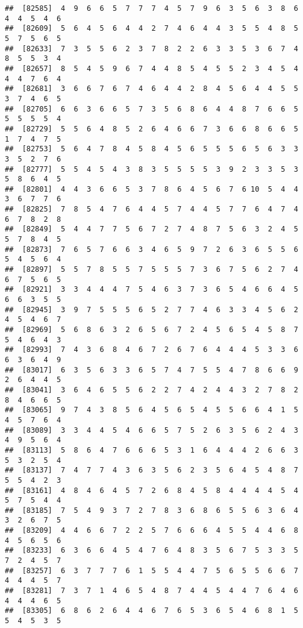 \documentclass[
]{book}
\begin{document}
\begin{verbatim}
##  [82585]  4  9  6  6  5  7  7  7  4  5  7  9  6  3  5  6  3  8  6  4  4  5  4  6
##  [82609]  5  6  4  5  6  4  4  2  7  4  6  4  4  3  5  5  4  8  5  5  7  5  6  5
##  [82633]  7  3  5  5  6  2  3  7  8  2  2  6  3  3  5  3  6  7  4  8  5  5  3  4
##  [82657]  8  5  4  5  9  6  7  4  4  8  5  4  5  5  2  3  4  5  4  4  4  7  6  4
##  [82681]  3  6  6  7  6  7  4  6  4  4  2  8  4  5  6  4  4  5  5  3  7  4  6  5
##  [82705]  6  6  3  6  6  5  7  3  5  6  8  6  4  4  8  7  6  6  5  5  5  5  5  4
##  [82729]  5  5  6  4  8  5  2  6  4  6  6  7  3  6  6  8  6  6  5  1  7  4  7  5
##  [82753]  5  6  4  7  8  4  5  8  4  5  6  5  5  5  6  5  6  3  3  3  5  2  7  6
##  [82777]  5  5  4  5  4  3  8  3  5  5  5  5  3  9  2  3  3  5  3  5  8  6  4  5
##  [82801]  4  4  3  6  6  5  3  7  8  6  4  5  6  7  6 10  5  4  4  3  6  7  7  6
##  [82825]  7  8  5  4  7  6  4  4  5  7  4  4  5  7  7  6  4  7  4  6  7  8  2  8
##  [82849]  5  4  4  7  7  5  6  7  2  7  4  8  7  5  6  3  2  4  5  5  7  8  4  5
##  [82873]  7  6  5  7  6  6  3  4  6  5  9  7  2  6  3  6  5  5  6  5  4  5  6  4
##  [82897]  5  5  7  8  5  5  7  5  5  5  7  3  6  7  5  6  2  7  4  6  7  5  6  5
##  [82921]  3  3  4  4  4  7  5  4  6  3  7  3  6  5  4  6  6  4  5  6  6  3  5  5
##  [82945]  3  9  7  5  5  5  6  5  2  7  7  4  6  3  3  4  5  6  2  4  5  4  6  7
##  [82969]  5  6  8  6  3  2  6  5  6  7  2  4  5  6  5  4  5  8  7  5  4  6  4  3
##  [82993]  7  4  3  6  8  4  6  7  2  6  7  6  4  4  4  5  3  3  6  6  3  6  4  9
##  [83017]  6  3  5  6  3  3  6  5  7  4  7  5  5  4  7  8  6  6  9  2  6  4  4  5
##  [83041]  3  6  4  6  5  5  6  2  2  7  4  2  4  4  3  2  7  8  2  8  4  6  6  5
##  [83065]  9  7  4  3  8  5  6  4  5  6  5  4  5  5  6  6  4  1  5  4  5  7  6  4
##  [83089]  3  3  4  4  5  4  6  6  5  7  5  2  6  3  5  6  2  4  3  4  9  5  6  4
##  [83113]  5  8  6  4  7  6  6  6  5  3  1  6  4  4  4  2  6  6  3  5  3  2  5  4
##  [83137]  7  4  7  7  4  3  6  3  5  6  2  3  5  6  4  5  4  8  7  5  5  4  2  3
##  [83161]  4  8  4  6  4  5  7  2  6  8  4  5  8  4  4  4  4  5  4  5  7  5  4  4
##  [83185]  7  5  4  9  3  7  2  7  8  3  6  8  6  5  5  6  3  6  4  3  2  6  7  5
##  [83209]  4  4  6  6  7  2  2  5  7  6  6  6  4  5  5  4  4  6  8  4  5  6  5  6
##  [83233]  6  3  6  6  4  5  4  7  6  4  8  3  5  6  7  5  3  3  5  7  2  4  5  7
##  [83257]  6  3  7  7  7  6  1  5  5  4  4  7  5  6  5  5  6  6  7  4  4  4  5  7
##  [83281]  7  3  7  1  4  6  5  4  8  7  4  4  5  4  4  7  6  4  6  4  4  4  6  5
##  [83305]  6  8  6  2  6  4  4  6  7  6  5  3  6  5  4  6  8  1  5  5  4  5  3  5

\end{verbatim}
\end{document}
